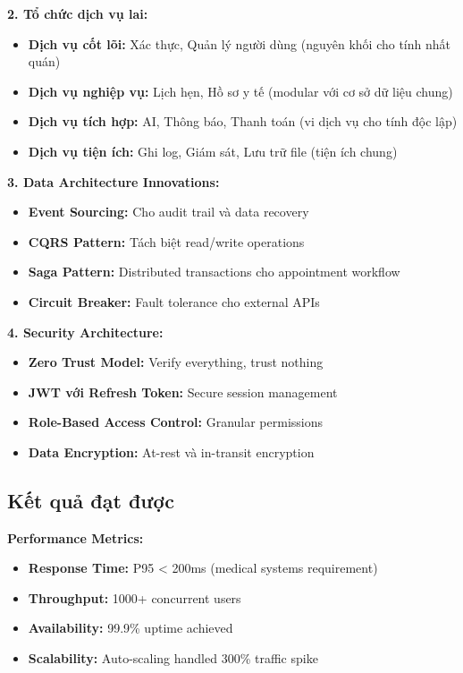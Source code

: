 \documentclass[../DoAn.tex]{subfiles}
\begin{document}
\textbf{2. Tổ chức dịch vụ lai:}
\begin{itemize}
    \item \textbf{Dịch vụ cốt lõi:} Xác thực, Quản lý người dùng (nguyên khối cho tính nhất quán)
    \item \textbf{Dịch vụ nghiệp vụ:} Lịch hẹn, Hồ sơ y tế (modular với cơ sở dữ liệu chung)
    \item \textbf{Dịch vụ tích hợp:} AI, Thông báo, Thanh toán (vi dịch vụ cho tính độc lập)
    \item \textbf{Dịch vụ tiện ích:} Ghi log, Giám sát, Lưu trữ file (tiện ích chung)
\end{itemize}

\textbf{3. Data Architecture Innovations:}
\begin{itemize}
    \item \textbf{Event Sourcing:} Cho audit trail và data recovery
    \item \textbf{CQRS Pattern:} Tách biệt read/write operations
    \item \textbf{Saga Pattern:} Distributed transactions cho appointment workflow
    \item \textbf{Circuit Breaker:} Fault tolerance cho external APIs
\end{itemize}

\textbf{4. Security Architecture:}
\begin{itemize}
    \item \textbf{Zero Trust Model:} Verify everything, trust nothing
    \item \textbf{JWT với Refresh Token:} Secure session management
    \item \textbf{Role-Based Access Control:} Granular permissions
    \item \textbf{Data Encryption:} At-rest và in-transit encryption
\end{itemize}

\subsection{Kết quả đạt được}

\textbf{Performance Metrics:}
\begin{itemize}
    \item \textbf{Response Time:} P95 < 200ms (medical systems requirement)
    \item \textbf{Throughput:} 1000+ concurrent users
    \item \textbf{Availability:} 99.9\% uptime achieved
    \item \textbf{Scalability:} Auto-scaling handled 300\% traffic spike
\end{itemize}
\end{document}
